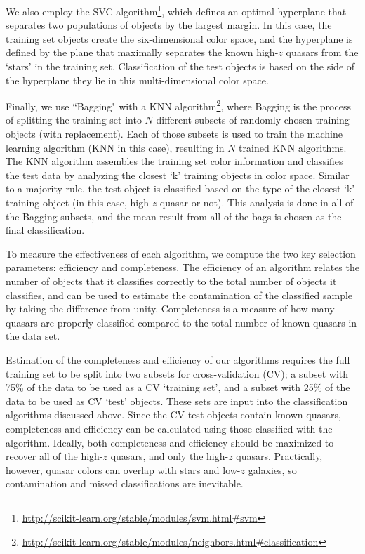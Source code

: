 \documentclass[apj, numberedappendix]{emulateapj}
\begin{document}
We also employ the SVC algorithm\footnote{\href{SVC}{http://scikit-learn.org/stable/modules/svm.html\#svm}}, which defines an optimal hyperplane that separates two populations of objects by the largest margin. In this case, the training set objects create the six-dimensional color space, and the hyperplane is defined by the plane that maximally separates the known high-$z$ quasars from the `stars' in the training set. Classification of the test objects is based on the side of the hyperplane they lie in this multi-dimensional color space. 

Finally, we use ``Bagging" with a KNN algorithm\footnote{\href{BKNN}{http://scikit-learn.org/stable/modules/neighbors.html\#classification}}, where Bagging is the process of splitting the training set into $N$ different subsets of randomly chosen training objects (with replacement). Each of those subsets is used to train the machine learning algorithm (KNN in this case), resulting in $N$ trained KNN algorithms. The KNN algorithm assembles the training set color information and classifies the test data by analyzing the closest `k' training objects in color space. Similar to a majority rule, the test object is classified based on the type of the closest `k' training object (in this case, high-$z$ quasar or not). This analysis is done in all of the Bagging subsets, and the mean result from all of the bags is chosen as the final classification. 
  
To measure the effectiveness of each algorithm, we compute the two key selection parameters: efficiency and completeness. The efficiency of an algorithm relates the number of objects that it classifies correctly to the total number of objects it classifies, and can be used to estimate the contamination of the classified sample by taking the difference from unity. Completeness is a measure of how many quasars are properly classified compared to the total number of known quasars in the data set. 

Estimation of the completeness and efficiency of our algorithms requires the full training set to be split into two subsets for cross-validation (CV); a subset with 75\% of the data to be used as a CV `training set', and a subset with 25\% of the data to be used as CV `test' objects. These sets are input into the classification algorithms discussed above. Since the CV test objects contain known quasars, completeness and efficiency can be calculated using those classified with the algorithm. Ideally, both completeness and efficiency should be maximized to recover all of the high-$z$ quasars, and only the high-$z$ quasars. Practically, however, quasar colors can overlap with stars and low-$z$ galaxies, so contamination and missed classifications are inevitable. 
\end{document}
